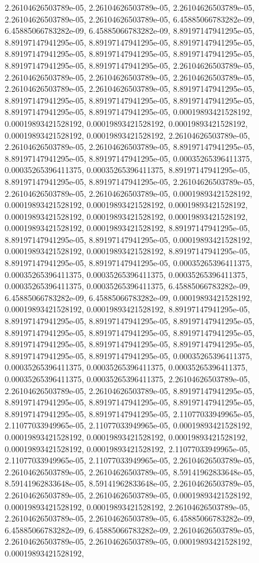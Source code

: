 \documentclass[
  ,man]{apa6}
\begin{document}
2.26104626503789e-05, 2.26104626503789e-05, 2.26104626503789e-05, 2.26104626503789e-05, 2.26104626503789e-05, 6.45885066783282e-09, 6.45885066783282e-09, 6.45885066783282e-09, 8.89197147941295e-05, 8.89197147941295e-05, 8.89197147941295e-05, 8.89197147941295e-05, 8.89197147941295e-05, 8.89197147941295e-05, 8.89197147941295e-05, 8.89197147941295e-05, 8.89197147941295e-05, 2.26104626503789e-05, 2.26104626503789e-05, 2.26104626503789e-05, 2.26104626503789e-05, 2.26104626503789e-05, 2.26104626503789e-05,
8.89197147941295e-05, 8.89197147941295e-05, 8.89197147941295e-05, 8.89197147941295e-05, 8.89197147941295e-05, 8.89197147941295e-05, 0.00019893421528192, 0.00019893421528192, 0.00019893421528192, 0.00019893421528192, 0.00019893421528192, 0.00019893421528192, 2.26104626503789e-05, 2.26104626503789e-05, 2.26104626503789e-05, 8.89197147941295e-05, 8.89197147941295e-05, 8.89197147941295e-05, 0.00035265396411375, 0.00035265396411375, 0.00035265396411375, 8.89197147941295e-05, 8.89197147941295e-05, 8.89197147941295e-05,
2.26104626503789e-05, 2.26104626503789e-05, 2.26104626503789e-05, 0.00019893421528192, 0.00019893421528192, 0.00019893421528192, 0.00019893421528192, 0.00019893421528192, 0.00019893421528192, 0.00019893421528192, 0.00019893421528192, 0.00019893421528192, 8.89197147941295e-05, 8.89197147941295e-05, 8.89197147941295e-05, 0.00019893421528192, 0.00019893421528192, 0.00019893421528192, 8.89197147941295e-05, 8.89197147941295e-05, 8.89197147941295e-05, 0.00035265396411375, 0.00035265396411375, 0.00035265396411375,
0.00035265396411375, 0.00035265396411375, 0.00035265396411375, 6.45885066783282e-09, 6.45885066783282e-09, 6.45885066783282e-09, 0.00019893421528192, 0.00019893421528192, 0.00019893421528192, 8.89197147941295e-05, 8.89197147941295e-05, 8.89197147941295e-05, 8.89197147941295e-05, 8.89197147941295e-05, 8.89197147941295e-05, 8.89197147941295e-05, 8.89197147941295e-05, 8.89197147941295e-05, 8.89197147941295e-05, 8.89197147941295e-05, 8.89197147941295e-05, 0.00035265396411375, 0.00035265396411375, 0.00035265396411375,
0.00035265396411375, 0.00035265396411375, 0.00035265396411375, 2.26104626503789e-05, 2.26104626503789e-05, 2.26104626503789e-05, 8.89197147941295e-05, 8.89197147941295e-05, 8.89197147941295e-05, 8.89197147941295e-05, 8.89197147941295e-05, 8.89197147941295e-05, 2.11077033949965e-05, 2.11077033949965e-05, 2.11077033949965e-05, 0.00019893421528192, 0.00019893421528192, 0.00019893421528192, 0.00019893421528192, 0.00019893421528192, 0.00019893421528192, 2.11077033949965e-05, 2.11077033949965e-05, 2.11077033949965e-05,
2.26104626503789e-05, 2.26104626503789e-05, 2.26104626503789e-05, 8.59141962833648e-05, 8.59141962833648e-05, 8.59141962833648e-05, 2.26104626503789e-05, 2.26104626503789e-05, 2.26104626503789e-05, 0.00019893421528192, 0.00019893421528192, 0.00019893421528192, 2.26104626503789e-05, 2.26104626503789e-05, 2.26104626503789e-05, 6.45885066783282e-09, 6.45885066783282e-09, 6.45885066783282e-09, 2.26104626503789e-05, 2.26104626503789e-05, 2.26104626503789e-05, 0.00019893421528192, 0.00019893421528192,
\end{document}
